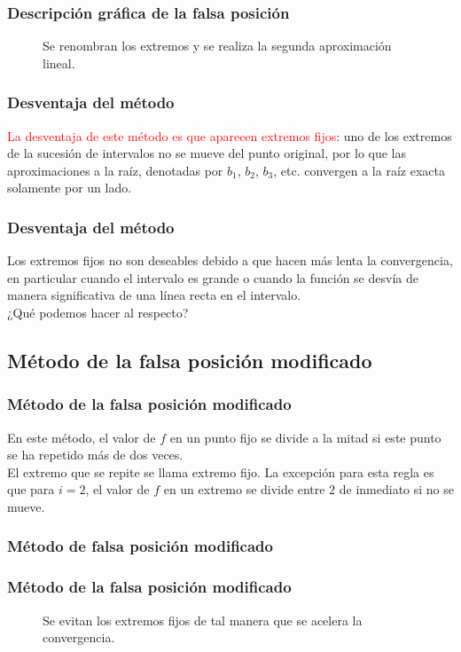 \begin{frame}[fragile]
\frametitle{Descripción gráfica de la falsa posición}
\begin{figure}
	\centering
	
	\caption{Se renombran los extremos y se realiza la segunda aproximación lineal.}
\end{figure}
\end{frame}
\begin{frame}
\frametitle{Desventaja del método}
\textcolor{red}{La desventaja de este método es que aparecen extremos fijos}: uno de los extremos de la sucesión de intervalos no se mueve del punto original, por lo que las aproximaciones a la raíz, denotadas por $b_{1}$, $b_{2}$, $b_{3}$, etc. convergen a la raíz exacta solamente por un lado.
\end{frame}
\begin{frame}
\frametitle{Desventaja del método}
Los extremos fijos no son deseables debido a que hacen más lenta la convergencia, en particular cuando el intervalo es grande o cuando la función se desvía de manera significativa de una línea recta en el intervalo.
\\
\bigskip
¿Qué podemos hacer al respecto?
\end{frame}
\subsection{Método de la falsa posición modificado}
\begin{frame}
\frametitle{Método de la falsa posición modificado}
En este método, el valor de $f$ en un punto fijo se divide a la mitad si este punto se ha repetido más de dos veces.
\\
\bigskip
El extremo que se repite se llama extremo fijo. La excepción para esta regla es que para $i = 2$, el valor de $f$ en un extremo se divide entre $2$ de inmediato si no se mueve.
\end{frame}
\begin{frame}[fragile]
\frametitle{Método de falsa posición modificado}
\begin{figure}
	\centering
	
\end{figure}
\end{frame}
\begin{frame}[fragile]
\frametitle{Método de la falsa posición modificado}
\begin{figure}
	\centering
	
	\caption{Se evitan los extremos fijos de tal manera que se acelera la convergencia.}
\end{figure}
\end{frame}
